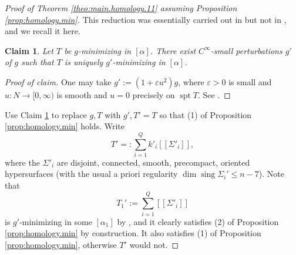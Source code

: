 \documentclass[11pt, letterpaper, reqno]{amsart}
\numberwithin{equation}{section}
\newtheorem{Cla}[Def]{Claim}
\theoremstyle{remark}
\newcommand{\supp}{\operatorname{spt}}
\newcommand{\sing}{\operatorname{sing}}
\newcommand{\eps}{\varepsilon}
\newcommand{\llbracket}{[\![}
\newcommand{\rrbracket}{]\!]}
\begin{document}
\begin{proof}[Proof of Theorem \ref{theo:main.homology.11} assuming Proposition \ref{prop:homology.min}]
This reduction was essentially carried out in \cite{CMS:generic.9.10} but not in \cite{CMS:generic.codim.plus.2}, and we recall it here.

\begin{Cla} \label{clai:homology.min.unique}
	Let $T$ be $g$-minimizing in $[\alpha]$. There exist $C^\infty$-small perturbations $g'$ of $g$ such that $T$ is uniquely $g'$-minimizing in $[\alpha]$.
\end{Cla}
\begin{proof}[Proof of claim]
	One may take $g' := (1+\eps u^2) g$, where $\eps > 0$ is small and $u : N \to [0, \infty)$ is smooth and $u = 0$ precisely on $\supp T$. See \cite[Lemma 5.2]{CMS:generic.9.10}.
\end{proof}

Use Claim \ref{clai:homology.min.unique} to replace $g, T$ with $g', T' = T$ so that (1) of Proposition \ref{prop:homology.min} holds. Write
\begin{equation} \label{eq:homology.min.tprime}
	T' =: \sum_{i=1}^Q k'_i \llbracket \Sigma'_i \rrbracket,
\end{equation}
where the $\Sigma'_i$ are disjoint, connected, smooth, precompact, oriented hypersurfaces (with the usual a priori regularity $\dim \sing \Sigma_i' \leq n-7$). Note that
\[ T_1' := \sum_{i=1}^Q \llbracket \Sigma'_i \rrbracket \]
is $g'$-minimizing in some $[\alpha_1]$ by \cite[Theorem 33.4]{Simon:GMT}, and it clearly satisfies (2) of Proposition \ref{prop:homology.min} by construction. It also satisfies (1) of Proposition \ref{prop:homology.min}, otherwise $T'$ would not. 


\end{proof}
\end{document}
